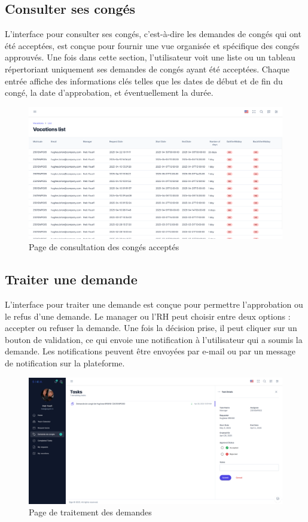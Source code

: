 \subsection{Consulter ses congés}
L'interface pour consulter ses congés, c'est-à-dire les demandes de congés qui ont été acceptées, est conçue pour fournir une vue organisée et spécifique des congés approuvés. Une fois dans cette section, l'utilisateur voit une liste ou un tableau répertoriant uniquement ses demandes de congés ayant été acceptées. Chaque entrée affiche des informations clés telles que les dates de début et de fin du congé, la date d'approbation, et éventuellement la durée.
\begin{figure}[h]
         \centering
         \includegraphics[width=16cm]{images/realisation/mesConges.png}
         \caption{Page de consultation des congés acceptés}
         \label{fig:ccon}
\end{figure}
\subsection{Traiter une demande}
L'interface pour traiter une demande est conçue pour permettre l'approbation ou le refus d'une demande. Le manager ou l'RH peut choisir entre deux options : accepter ou refuser la demande. Une fois la décision prise, il peut cliquer sur un bouton de validation, ce qui envoie une notification à l'utilisateur qui a soumis la demande. Les notifications peuvent être envoyées par e-mail ou par un message de notification sur la plateforme.
\newpage
\begin{figure}[h]
     \centering
     \includegraphics[width=16cm]{images/realisation/TraiterDemande.png}
     \caption{Page de traitement des demandes}
     \label{fig:traid}
\end{figure}
